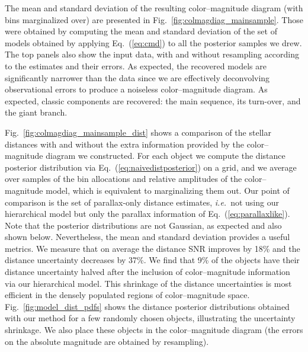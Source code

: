 \documentclass[manuscript, letterpaper]{aastex6}
\newcommand{\ie}{{\textit{i.e.}~}}
\newcommand{\equref}[1]{{\xspace}Eq.~(\ref{#1})}
\newcommand{\figref}[1]{{\xspace}Fig.~\ref{#1}}
\begin{document}
The mean and standard deviation of the resulting color--magnitude diagram (with bins marginalized over) are presented in \figref{fig:colmagdiag_mainsample}.
Those were obtained by computing the mean and standard deviation of the set of models obtained by applying \equref{eq:cmd} to all the posterior samples we drew.   
The top panels also show the input data, with and without resampling according to the estimates and their errors.
As expected, the recovered models are significantly narrower than the data since we are effectively deconvolving observational errors to produce a noiseless color--magnitude diagram. 
As expected, classic components are recovered: the main sequence, its turn-over, and the giant branch.

\figref{fig:colmagdiag_mainsample_dist} shows a comparison of the stellar distances with and without the extra information provided by the color--magnitude diagram we constructed.
For each object we compute the distance posterior distribution via \equref{eq:naivedistposterior} on a grid, and we average over samples of the bin allocations and relative amplitudes of the color--magnitude model, which is equivalent to marginalizing them out.
Our point of comparison is the set of parallax-only distance estimates, \ie not using our hierarchical model but only the parallax information of \equref{eq:parallaxlike}.
Note that the posterior distributions are not Gaussian, as expected and also shown below. 
Nevertheless, the mean and standard deviation provides a useful metrics. 
We measure that on average the distance SNR improves by 18\% and the distance uncertainty decreases by 37\%.
We find that 9\% of the objects have their distance uncertainty halved after the inclusion of color--magnitude information via our hierarchical model. 
This shrinkage of the distance uncertainties is most efficient in the densely populated regions of color--magnitude space.
\figref{fig:model_dist_pdfs} shows the distance posterior distributions obtained with our method for a few randomly chosen objects, illustrating the uncertainty shrinkage.
We also place these objects in the color--magnitude diagram (the errors on the absolute magnitude are obtained by resampling).
\end{document}
